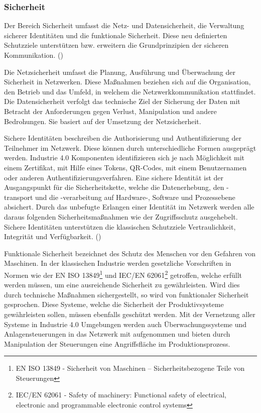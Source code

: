 \subsubsection{Sicherheit}
Der Bereich Sicherheit umfasst die Netz- und Datensicherheit, die Verwaltung sicherer Identitäten und die funktionale Sicherheit. Diese neu definierten Schutzziele unterstützen bzw. erweitern die Grundprinzipien der sicheren Kommunikation. (\cite{BMWiNeCon2016})

Die Netzsicherheit umfasst die Planung, Ausführung und Überwachung der Sicherheit in Netzwerken. Diese Maßnahmen beziehen sich auf die Organisation, den Betrieb und das Umfeld, in welchem die Netzwerkkommunikation stattfindet. Die Datensicherheit verfolgt das technische Ziel der Sicherung der Daten mit Betracht der Anforderungen gegen Verlust, Manipulation und andere Bedrohungen. Sie basiert auf der Umsetzung der Netzsicherheit.

Sichere Identitäten beschreiben die Authorisierung und Authentifizierung der Teilnehmer im Netzwerk. Diese können durch unterschiedliche Formen ausgeprägt werden. Industrie 4.0 Komponenten identifizieren sich je nach Möglichkeit mit einem Zertifikat, mit Hilfe eines Tokens, QR-Codes, mit einem Benutzernamen oder anderen Authentifizierungsverfahren. Eine sichere Identität ist der Ausgangspunkt für die Sicherheitskette, welche die Datenerhebung, den -transport und die -verarbeitung auf Hardware-, Software und Prozessebene absichert. Durch das unbefugte Erlangen einer Identität im Netzwerk werden alle daraus folgenden Sicherheitsmaßnahmen wie der Zugriffsschutz ausgehebelt. Sichere Identitäten unterstützen die klassischen Schutzziele Vertraulichkeit, Integrität und Verfügbarkeit. (\cite{sichIden2017})

Funktionale Sicherheit bezeichnet des Schutz des Menschen vor den Gefahren von Maschinen. In der klassischen Industrie werden gesetzliche Vorschriften in Normen wie der EN ISO 13849\footnote{EN ISO 13849 - Sicherheit von Maschinen – Sicherheitsbezogene Teile von Steuerungen} und \ac{IEC}/EN 62061\footnote{IEC/EN 62061 - Safety of machinery: Functional safety of electrical, electronic and programmable electronic control systems} getroffen, welche erfüllt werden müssen, um eine ausreichende Sicherheit zu gewährleisten. Wird dies durch technische Maßnahmen sichergestellt, so wird von funktionaler Sicherheit gesprochen. Diese Systeme, welche die Sicherheit der Produktivsysteme gewährleisten sollen, müssen ebenfalls geschützt werden. Mit der Vernetzung aller Systeme in Industrie 4.0 Umgebungen werden auch Überwachungssysteme und Anlagensteuerungen in das Netzwerk mit aufgenommen und bieten durch Manipulation der Steuerungen eine Angriffsfläche im Produktionsprozess.

